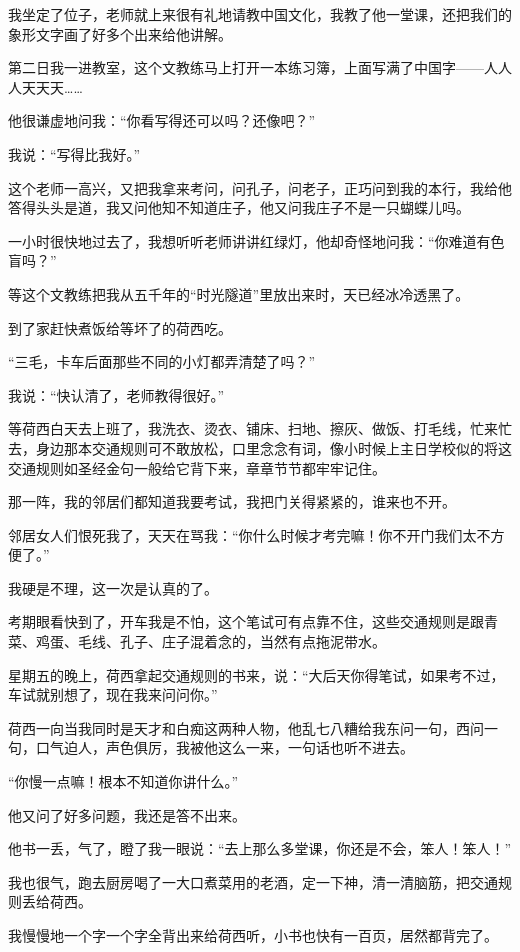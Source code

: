 \par 我坐定了位子，老师就上来很有礼地请教中国文化，我教了他一堂课，还把我们的象形文字画了好多个出来给他讲解。
\par 第二日我一进教室，这个文教练马上打开一本练习簿，上面写满了中国字——人人人天天天……
\par 他很谦虚地问我：“你看写得还可以吗？还像吧？”
\par 我说：“写得比我好。”
\par 这个老师一高兴，又把我拿来考问，问孔子，问老子，正巧问到我的本行，我给他答得头头是道，我又问他知不知道庄子，他又问我庄子不是一只蝴蝶儿吗。
\par 一小时很快地过去了，我想听听老师讲讲红绿灯，他却奇怪地问我：“你难道有色盲吗？”
\par 等这个文教练把我从五千年的“时光隧道”里放出来时，天已经冰冷透黑了。
\par 到了家赶快煮饭给等坏了的荷西吃。
\par “三毛，卡车后面那些不同的小灯都弄清楚了吗？”
\par 我说：“快认清了，老师教得很好。”
\par 等荷西白天去上班了，我洗衣、烫衣、铺床、扫地、擦灰、做饭、打毛线，忙来忙去，身边那本交通规则可不敢放松，口里念念有词，像小时候上主日学校似的将这交通规则如圣经金句一般给它背下来，章章节节都牢牢记住。
\par 那一阵，我的邻居们都知道我要考试，我把门关得紧紧的，谁来也不开。
\par 邻居女人们恨死我了，天天在骂我：“你什么时候才考完嘛！你不开门我们太不方便了。”
\par 我硬是不理，这一次是认真的了。
\par 考期眼看快到了，开车我是不怕，这个笔试可有点靠不住，这些交通规则是跟青菜、鸡蛋、毛线、孔子、庄子混着念的，当然有点拖泥带水。
\par 星期五的晚上，荷西拿起交通规则的书来，说：“大后天你得笔试，如果考不过，车试就别想了，现在我来问问你。”
\par 荷西一向当我同时是天才和白痴这两种人物，他乱七八糟给我东问一句，西问一句，口气迫人，声色俱厉，我被他这么一来，一句话也听不进去。
\par “你慢一点嘛！根本不知道你讲什么。”
\par 他又问了好多问题，我还是答不出来。
\par 他书一丢，气了，瞪了我一眼说：“去上那么多堂课，你还是不会，笨人！笨人！”
\par 我也很气，跑去厨房喝了一大口煮菜用的老酒，定一下神，清一清脑筋，把交通规则丢给荷西。
\par 我慢慢地一个字一个字全背出来给荷西听，小书也快有一百页，居然都背完了。
